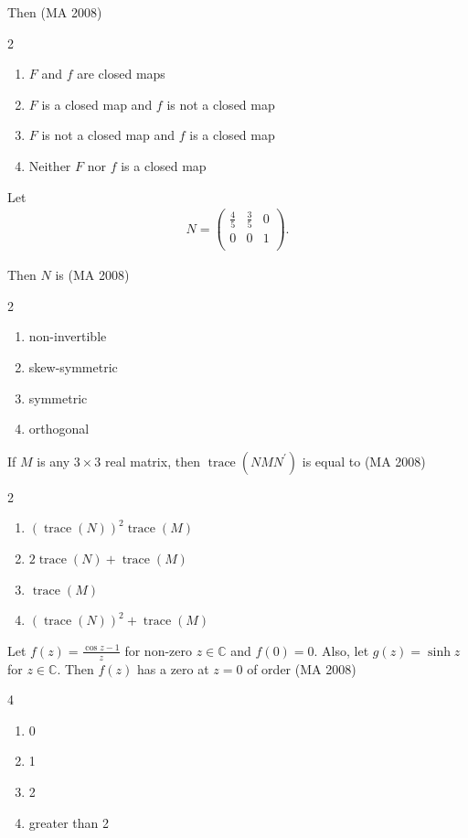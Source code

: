 \item
Then
\hfill (MA 2008)
\begin{multicols}{2}
\begin{enumerate}
    \item $F$ and $f$ are closed maps
    \item $F$ is a closed map and $f$ is not a closed map
    \item $F$ is not a closed map and $f$ is a closed map
    \item Neither $F$ nor $f$ is a closed map
\end{enumerate}
\end{multicols}

\item
Let
\begin{align}
   N =
\begin{pmatrix}
\frac{4}{5} & \frac{3}{5} & 0 \\
0 & 0 & 1 \\
\end{pmatrix}. 
\end{align}

Then $N$ is
\hfill (MA 2008)
\begin{multicols}{2}
\begin{enumerate}
    \item non-invertible
    \item skew-symmetric
    \item symmetric
    \item orthogonal
\end{enumerate}
\end{multicols}

\item
If $M$ is any $3 \times 3$ real matrix, then $\operatorname{trace}(N M N^{\prime})$ is equal to
\hfill (MA 2008)
\begin{multicols}{2}
\begin{enumerate}
    \item $(\operatorname{trace}(N))^2 \operatorname{trace}(M)$
    \item $2 \operatorname{trace}(N) + \operatorname{trace}(M)$
    \item $\operatorname{trace}(M)$
    \item $(\operatorname{trace}(N))^2 + \operatorname{trace}(M)$
\end{enumerate}
\end{multicols}

\item
Let $f(z) = \frac{\cos z - 1}{z}$ for non-zero $z \in \mathbb{C}$ and $f(0) = 0$. Also, let $g(z) = \sinh z$ for $z \in \mathbb{C}$. Then $f(z)$ has a zero at $z=0$ of order
\hfill (MA 2008)
\begin{multicols}{4}
\begin{enumerate}
    \item 0
    \item 1
    \item 2
    \item greater than 2
\end{enumerate}
\end{multicols}

